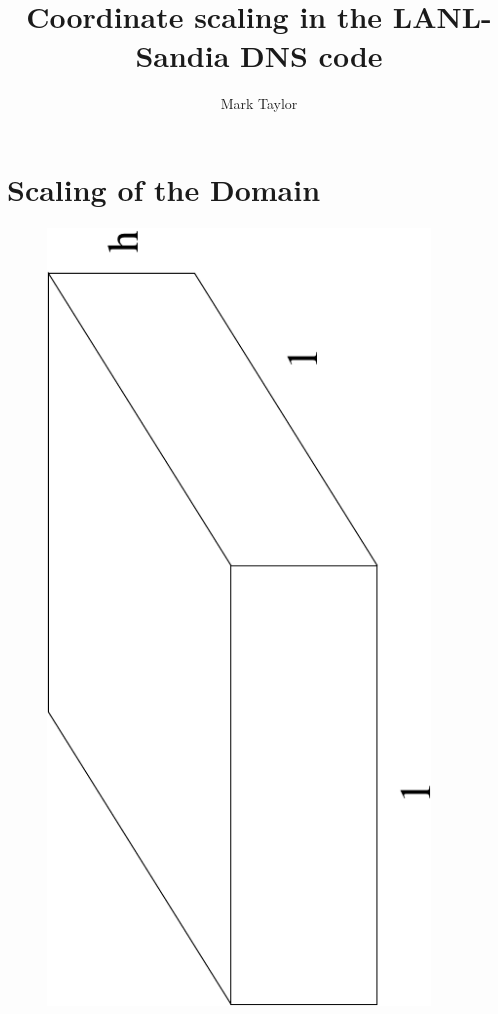 \documentclass[12pt]{article}
\title{Coordinate scaling in the LANL-Sandia DNS code}
\author{Mark Taylor}
\begin{document}

\section{Scaling of the Domain}
\begin{figure}
\begin{center}
\includegraphics[angle=-90,width=4in]{box}
\caption{ }
\label{F:box}
\end{center}
\end{figure}
\end{document}
